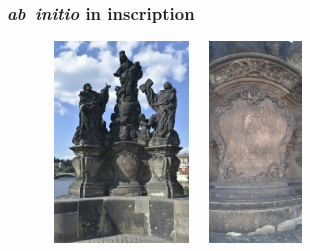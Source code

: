 {\frame
{
	\frametitle{\textit{ab~initio} \textrm{in inscription}}
\begin{figure}[h!]
\vspace*{-0.15in}
\centering
\includegraphics[height=2.10in,width=1.55in,viewport=5 3 1550 2180,clip]{Figures/Madonna-Ss.-Dominic-and-Thomas_Aquinas-3.jpeg}
\hspace*{15pt}
\includegraphics[height=2.10in,width=1.15in,viewport=5 3 950 1880,clip]{Figures/Madonna-Ss.-Dominic-and-Thomas_Aquinas-Inscription_2.jpeg}
\label{ABINITIO-inscription}
\end{figure}
\begin{minipage}{0.53\textwidth}
	{\fontsize{8.2pt}{4.2pt}}
\end{minipage}
\hspace*{5pt}
\begin{minipage}{0.30\textwidth}
	\textrm{\fontsize{4.2pt}{4.2pt}\selectfont{The inscription in English:}}\\
	\textrm{\fontsize{8.2pt}{4.2pt}\selectfont{\textcolor{blue}{Mind the congregation that has been yours} \textcolor{purple}{since the beginning}}}
\end{minipage}
}

}
